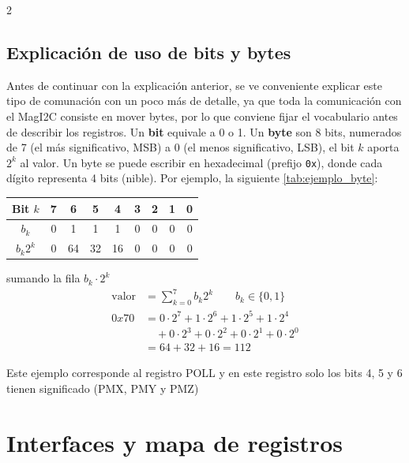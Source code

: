 \documentclass[11pt,letterpaper]{article}
\begin{document}
\begin{multicols*}{2}
\subsection{Explicación de uso de bits y bytes}
Antes de continuar con la explicación anterior, se ve conveniente explicar este tipo de comunación con un poco más de detalle, ya que toda la comunicación con el MagI2C consiste en mover bytes, por lo que conviene fijar el vocabulario antes de describir los registros. Un \textbf{bit} equivale a 0 o 1. Un \textbf{byte} son 8 bits, numerados de 7 (el más significativo, MSB) a 0 (el menos significativo, LSB), el bit $k$ aporta $2^k$ al valor. Un byte se puede escribir en hexadecimal (prefijo \verb|0x|), donde cada dígito representa 4 bits (nible). Por ejemplo, la siguiente \ref{tab:ejemplo_byte}:

\begin{center}
    \label{tab:ejemplo_byte}
    \small
    \begin{tabular}{|c|c|c|c|c||c|c|c|c|}
        \hline
        Bit $k$  & 7 & 6 & 5 & 4 & 3 & 2 & 1 & 0 \\
        \hline
        $b_k$    & 0 & 1 & 1 & 1 & 0 & 0 & 0 & 0  \\
        \hline
        $b_k2^k$ & 0 & 64 & 32 & 16 & 0 & 0 & 0 & 0\\
        \hline
    \end{tabular}
\end{center}

sumando la fila $b_k\cdot2^k$
\begin{align}
    \text{valor} &= \sum_{k=0}^{7} b_k 2^k \qquad b_k \in \{0, 1\} \\
    0x70 &= 0\cdot2^7 + 1\cdot2^6 + 1\cdot2^5 + 1\cdot2^4 \nonumber \\
    &\quad + 0\cdot2^3 + 0\cdot2^2 + 0\cdot2^1 + 0\cdot2^0 \nonumber \\
    &= 64+32+16 = 112 \nonumber
\end{align}

Este ejemplo corresponde al registro POLL y en este registro solo los bits 4, 5 y 6 tienen significado (PMX, PMY y PMZ)


\section{Interfaces y mapa de registros}


\end{multicols*}
\end{document}
